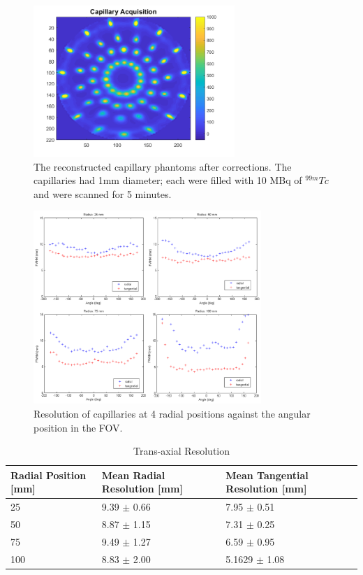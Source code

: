 \begin{figure}[!t]
\centering
\includegraphics[width=3in]{figures/Capillary_newLRF.PNG}

\caption{The reconstructed capillary phantoms after corrections. The capillaries had 1mm diameter; each were filled with 10 MBq of $^{99m}Tc$ and were scanned for 5 minutes.}
\label{fig_ImageRes}
\end{figure}

\begin{figure}[!t]
\centering
\includegraphics[width=3.4in]{figures/resolutions.png}

\caption{Resolution of capillaries at 4 radial positions against the angular position in the FOV.}
\label{fig_resolution}
\end{figure}

\begin{table}[!b]
\renewcommand{\arraystretch}{1.3}

\captionsetup{font=small}
\caption{Trans-axial Resolution}
\label{table_reso}
\centering

\begin{tabular}{|p{2.5cm}|p{2.8cm}|p{2.8cm}|}
\hline
Radial Position [mm]& Mean Radial Resolution [mm]& Mean Tangential Resolution [mm] \\
\hline
 25 & 9.39 $\pm$ 0.66 & 7.95 $\pm$ 0.51\\
\hline
 50 & 8.87 $\pm$ 1.15 & 7.31 $\pm$ 0.25\\
\hline
 75 & 9.49 $\pm$ 1.27 & 6.59 $\pm$ 0.95\\
\hline
 100 & 8.83 $\pm$ 2.00 & 5.1629 $\pm$ 1.08\\
\hline
\end{tabular}
\end{table}

